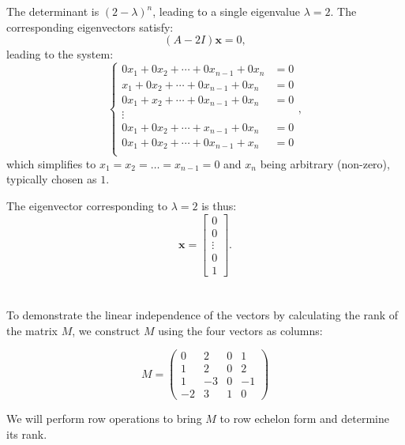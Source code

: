\documentclass{article}
\begin{document}
The determinant is $\left(2-\lambda\right)^n$,
leading to a single eigenvalue \( \lambda = 2 \).
The corresponding eigenvectors satisfy:
\[ (A - 2I)\mathbf{x} = 0, \]
leading to the system:
\[ \begin{cases}
        0x_1 + 0x_2 + \cdots + 0x_{n-1} + 0x_n & = 0 \\
        x_1 + 0x_2 + \cdots + 0x_{n-1} + 0x_n  & = 0 \\
        0x_1 + x_2 + \cdots + 0x_{n-1} + 0x_n  & = 0 \\
        \vdots                                       \\
        0x_1 + 0x_2 + \cdots + x_{n-1} + 0x_n  & = 0 \\
        0x_1 + 0x_2 + \cdots + 0x_{n-1} + x_n  & = 0 \\
    \end{cases}, \]
which simplifies to \(x_1 = x_2 = \ldots = x_{n-1} = 0\) and \(x_n\) being arbitrary (non-zero), typically chosen as \(1\).

The eigenvector corresponding to \(\lambda = 2\) is thus:
\[ \mathbf{x} = \begin{bmatrix} 0 \\ 0 \\ \vdots \\ 0 \\ 1 \end{bmatrix}. \]

\section{}
\subsection{}
To demonstrate the linear independence of the vectors by calculating the rank of the matrix \( M \), we construct \( M \) using the four vectors as columns:

\[
    M = \begin{pmatrix} 0 & 2 & 0 & 1 \\ 1 & 2 & 0 & 2 \\ 1 & -3 & 0 & -1 \\ -2 & 3 & 1 & 0 \end{pmatrix}
\]

We will perform row operations to bring \( M \) to row echelon form and determine its rank.
\end{document}

